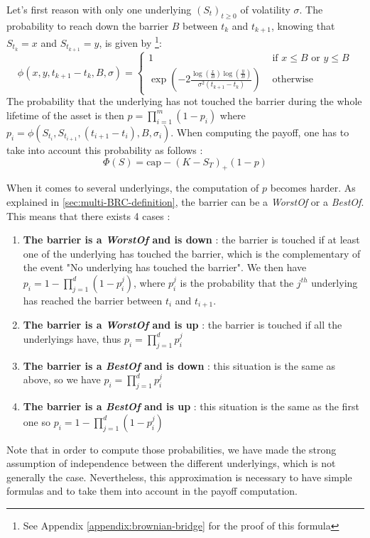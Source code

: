 \documentclass[a4paper,11pt,english]{book}
\begin{document}
Let's first reason with only one underlying $(S_{t})_{t\geq0}$ of volatility $\sigma$. The probability to reach down the barrier $B$ between $t_{k}$ and $t_{k+1}$, knowing that $S_{t_{k}}=x$ and $S_{t_{k+1}}=y$, is given by \footnote{See Appendix \ref{appendix:brownian-bridge} for the proof of this formula}:
$$\phi(x,y,t_{k+1}-t_k,B,\sigma) = 
\begin{cases}
1 &\text{ if } x\leq B \text{ or } y\leq B \\
\exp(-2\frac{\log(\frac{x}{B})\log(\frac{y}{B})}{\sigma^{2}(t_{k+1}-t_k)}) &\text{ otherwise }
\end{cases}$$
The probability that the underlying has not touched the barrier during the whole lifetime of the asset is then $p=\prod_{i=1}^{m}(1-p_{i})$ where $p_{i}=\phi(S_{t_{i}},S_{t_{i+1}},(t_{i+1}-t_i),B,\sigma_{i})$. When computing the payoff, one has to take into account this probability as follows :
$$\Phi(S) = \text{cap} -(K-S_{T})_{+}(1-p)$$

When it comes to several underlyings, the computation of $p$ becomes harder. As explained in \ref{sec:multi-BRC-definition}, the barrier can be a \textit{WorstOf} or a \textit{BestOf}. This means that there exists 4 cases :
\begin{enumerate}
    \item \textbf{The barrier is a \textit{WorstOf} and is down} : the barrier is touched if at least one of the underlying has touched the barrier, which is the complementary of the event "No underlying has touched the barrier". We then have $p_{i}=1-\prod_{j=1}^{d}(1-p_{i}^{j})$, where $p_{i}^{j}$ is the probability that the $j^{th}$ underlying has reached the barrier between $t_{i}$ and $t_{i+1}$.
    
    \item \textbf{The barrier is a \textit{WorstOf} and is up} : the barrier is touched if all the underlyings have, thus $p_{i}=\prod_{j=1}^{d}p_{i}^{j}$
    
    \item \textbf{The barrier is a \textit{BestOf} and is down} : this situation is the same as above, so we have $p_{i}=\prod_{j=1}^{d}p_{i}^{j}$
    
    \item \textbf{The barrier is a \textit{BestOf} and is up} : this situation is the same as the first one so  $p_{i}=1-\prod_{j=1}^{d}(1-p_{i}^{j})$
\end{enumerate}
Note that in order to compute those probabilities, we have made the strong assumption of independence between the different underlyings, which is not generally the case. Nevertheless, this approximation is necessary to have simple formulas and to take them into account in the payoff computation.
\end{document}
